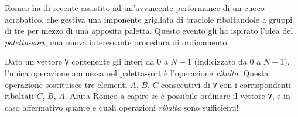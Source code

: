 \usepackage{xcolor}
\usepackage{afterpage}
\usepackage{pifont,mdframed}
\usepackage[bottom]{footmisc}



\newcommand{\inputfile}{\texttt{input.txt}}
\newcommand{\outputfile}{\texttt{output.txt}}

\newenvironment{warning}
  {\par\begin{mdframed}[linewidth=2pt,linecolor=gray]%
    \begin{list}{}{\leftmargin=1cm
                   \labelwidth=\leftmargin}\item[\Large\ding{43}]}
  {\end{list}\end{mdframed}\par}

\newcommand{\funcitem}[2]{\item[$\blacksquare$] \textbf{\large \textsf{Funzione} \texttt{#1}} \vspace{-0.3cm} \begin{center}\begin{tabularx}{\textwidth}{|c|X|} \hline #2 \hline \end{tabularx}\end{center}}



	Romeo ha di recente assistito ad un'avvincente performance di un cuoco acrobatico, che gestiva una imponente grigliata di braciole ribaltandole a gruppi di tre per mezzo di una apposita paletta. Questo evento gli ha ispirato l'idea del \emph{paletta-sort}, una nuova interessante procedura di ordinamento.

	Dato un vettore \texttt{V} contenente gli interi da $0$ a $N-1$ (indicizzato da $0$ a $N-1$), l'unica operazione ammessa nel paletta-sort è l'operazione \emph{ribalta}. Questa operazione sostituisce tre elementi $A$, $B$, $C$  consecutivi di \texttt{V} con i corrispondenti ribaltati $C$, $B$, $A$. Aiuta Romeo a capire se è possibile ordinare il vettore \texttt{V}, e in caso affermativo quante e quali operazioni \emph{ribalta} sono sufficienti!


